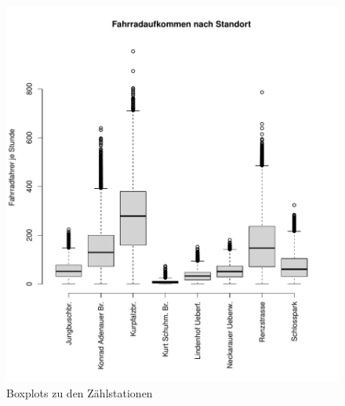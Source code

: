 \documentclass[a4paper,12pt]{thesis}
\begin{document}
\begin{figure}[!ht]
	\centering
	\includegraphics[width=\textwidth]{Plots/Boxplot_Stationen.pdf}
	\caption{Boxplots zu den Zählstationen}
	\label{BoxplotStationen}
\end{figure}
\end{document}
